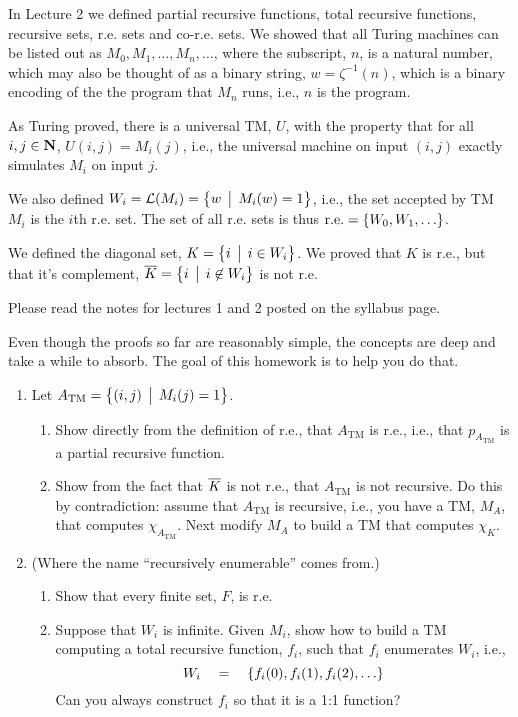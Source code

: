 \documentclass[12pt]{article}
\begin{document}
\thispagestyle{empty}
\noindent{}
\addtocounter{section}{2}

In Lecture 2 we defined partial recursive functions, total recursive functions, recursive sets,
r.e. sets and co-r.e. sets. We showed that all Turing machines can be listed out as $M_0, M_1, 
\ldots, M_n, \ldots$, where the subscript, $n$, is a natural number, which may also be thought of as a binary
string, $w = \zeta^{-1}(n)$, which is a binary encoding of the the program that $M_n$ runs, i.e.,
$n$ is the program. 

As Turing proved, there is a universal TM, $U$, with the property that for all $i,j\in\mbox{\bf N}$, $U(i,j) =
M_i(j)$, i.e., the universal machine on input $(i,j)$ exactly simulates $M_i$ on input $j$.

We also defined $W_i = {\cal L}(M_i) = \bigl\{ w \,\bigm|\, M_i(w) = 1 \bigr\}$, i.e., the set accepted by TM $M_i$ is
the $i$th r.e. set.  The set of all r.e. sets is thus $\mbox{{\rm r.e.}} = \{ W_0, W_1, \ldots \}$.

We defined the diagonal set, $K = \bigl\{ i \,\bigm|\, i \in W_i \bigr\}$. We proved that $K$ is r.e., but that it's
complement, $\overline{K}  = \bigl\{ i \,\bigm|\, i \not\in W_i \bigr\}$ is not r.e.

Please read the notes for lectures 1 and 2 posted on the syllabus page.

Even though the proofs so far are reasonably simple, the concepts are deep and take a while to
absorb.  The goal of this homework is to help you do that.

\begin{enumerate}
\item Let $A_{\text{TM}} = \bigl\{ (i,j) \,\bigm|\, M_i(j) = 1 \bigr\}$.  

\begin{enumerate}
   \item Show directly from the definition of r.e., that $A_{\text{TM}}$ is r.e., i.e., that 
         $p_{A_{\text{TM}}}$ is a partial recursive function.  
   \item Show from the fact that $\overline{K}$ is not r.e., that $A_{\text{TM}}$ is not recursive.  Do
     this by contradiction:  assume that $A_{\text{TM}}$ is recursive, i.e., you have a TM, $M_A$, that
     computes $\chi_{A_{\text{TM}}}$.  Next modify $M_A$ to build a TM that computes $\chi_K$.
\end{enumerate}

\item (Where the name ``recursively enumerable'' comes from.)
  \begin{enumerate}
   \item Show that every finite set, $F$, is r.e.
   \item Suppose that $W_i$ is infinite.  Given $M_i$, show how to build a TM computing a total
     recursive function, $f_i$, such that $f_i$ enumerates $W_i$, i.e., 
\[ W_i \quad =\quad \{ f_i(0), f_i(1), f_i(2), \ldots  \}\]
Can you always construct $f_i$ so that it is a 1:1 function?
  \end{enumerate}

\end{enumerate}
\end{document}
